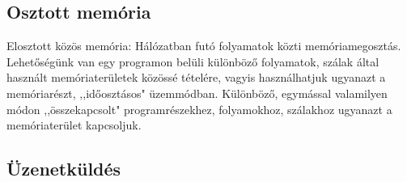 \documentclass[margin=0px]{article}
\begin{document}
	\subsection{Osztott memória}
	
	Elosztott közös memória: Hálózatban futó folyamatok közti memóriamegosztás. \\
	Lehetőségünk van egy programon belüli különböző folyamatok, szálak által használt memóriaterületek közössé tételére, vagyis használhatjuk ugyanazt a memóriarészt, ,,időosztásos" üzemmódban. Különböző, egymással valamilyen módon ,,összekapcsolt" programrészekhez, folyamokhoz, szálakhoz ugyanazt a memóriaterület kapcsoljuk.
	
	\subsection{Üzenetküldés}
	
\end{document}
